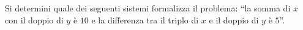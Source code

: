 Si determini quale dei seguenti sistemi formalizza il problema: 
“la somma di $x$ con il doppio di $y$ è $10$ e 
la differenza tra il triplo di $x$ e il doppio di $y$ è $5$”.
